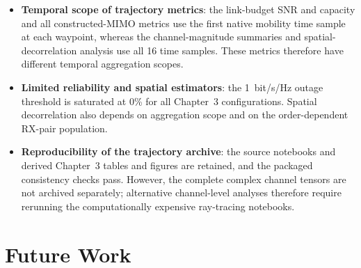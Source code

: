\begin{itemize}
    \item \textbf{Temporal scope of trajectory metrics}: the link-budget SNR and capacity and all constructed-MIMO metrics use the first native mobility time sample at each waypoint, whereas the channel-magnitude summaries and spatial-decorrelation analysis use all 16 time samples. These metrics therefore have different temporal aggregation scopes.
    \item \textbf{Limited reliability and spatial estimators}: the 1~bit/s/Hz outage threshold is saturated at 0\% for all Chapter~3 configurations. Spatial decorrelation also depends on aggregation scope and on the order-dependent RX-pair population.
    \item \textbf{Reproducibility of the trajectory archive}: the source notebooks and derived Chapter~3 tables and figures are retained, and the packaged consistency checks pass. However, the complete complex channel tensors are not archived separately; alternative channel-level analyses therefore require rerunning the computationally expensive ray-tracing notebooks.
\end{itemize}

\section{Future Work}


